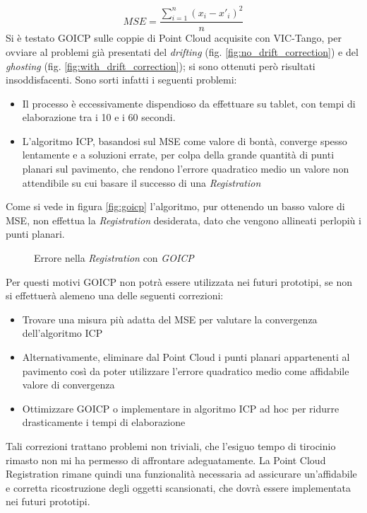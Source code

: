 $$
	MSE = \displaystyle\frac{\sum_{i=1}^{n} (x_i - x'_i)^2}{ n }
$$
Si è testato GOICP sulle coppie di Point Cloud acquisite con VIC-Tango, per ovviare al problemi già presentati del \emph{drifting} (fig. \ref{fig:no_drift_correction}) e del \emph{ghosting} (fig. \ref{fig:with_drift_correction}); si sono ottenuti però risultati insoddisfacenti. Sono sorti infatti i seguenti problemi:
\begin{itemize}
\item Il processo è eccessivamente dispendioso da effettuare su tablet, con tempi di elaborazione tra i 10 e i 60 secondi.
\item L'algoritmo ICP, basandosi sul MSE come valore di bontà, converge spesso lentamente e  a soluzioni errate, per colpa della grande quantità di punti planari sul pavimento, che rendono l'errore quadratico medio un valore non attendibile su cui basare il successo di una \emph{Registration} 
\end{itemize}
Come si vede in figura \ref{fig:goicp} l'algoritmo, pur ottenendo un basso valore di MSE, non effettua la \emph{Registration} desiderata, dato che vengono allineati perlopiù i punti planari.
\begin{figure}[htp] 
    \centering
    \hfill%
    \hfill%
    \caption{Errore nella \emph{Registration} con \emph{GOICP}}
\end{figure}
\newline

\noindent
Per questi motivi GOICP non potrà essere utilizzata nei futuri prototipi, se non si effettuerà alemeno una delle seguenti correzioni:
\begin{itemize}
\item Trovare una misura più adatta del MSE per valutare la convergenza dell'algoritmo ICP
\item Alternativamente, eliminare dal Point Cloud i punti planari appartenenti al pavimento così da poter utilizzare l'errore quadratico medio come affidabile valore di convergenza
\item Ottimizzare GOICP o implementare in algoritmo ICP ad hoc per ridurre drasticamente i tempi di elaborazione
\end{itemize}
\noindent
Tali correzioni trattano problemi non triviali, che l'esiguo tempo di tirocinio rimasto non mi ha permesso di affrontare adeguatamente. La Point Cloud Registration rimane quindi una funzionalità necessaria ad assicurare un'affidabile e corretta ricostruzione degli oggetti scansionati, che dovrà essere implementata nei futuri prototipi.




